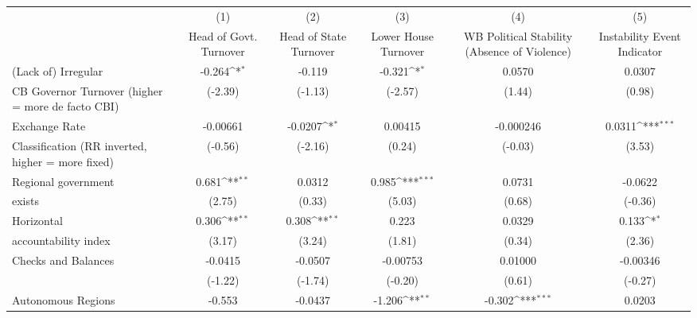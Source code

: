 {
\def\sym#1{\ifmmode^{#1}\else\(^{#1}\)\fi}
\begin{tabular}{l*{5}{c}}
\hline\hline
                    &\multicolumn{1}{c}{(1)}&\multicolumn{1}{c}{(2)}&\multicolumn{1}{c}{(3)}&\multicolumn{1}{c}{(4)}&\multicolumn{1}{c}{(5)}\\
                    &\multicolumn{1}{c}{Head of Govt. Turnover}&\multicolumn{1}{c}{Head of State Turnover}&\multicolumn{1}{c}{Lower House Turnover}&\multicolumn{1}{c}{WB Political Stability (Absence of Violence)}&\multicolumn{1}{c}{Instability Event Indicator}\\
\hline
(Lack of) Irregular &      -0.264\sym{*}  &      -0.119         &      -0.321\sym{*}  &      0.0570         &      0.0307         \\
CB Governor Turnover (higher = more de facto CBI)&     (-2.39)         &     (-1.13)         &     (-2.57)         &      (1.44)         &      (0.98)         \\
[1em]
Exchange Rate       &    -0.00661         &     -0.0207\sym{*}  &     0.00415         &   -0.000246         &      0.0311\sym{***}\\
Classification (RR inverted, higher = more fixed)&     (-0.56)         &     (-2.16)         &      (0.24)         &     (-0.03)         &      (3.53)         \\
[1em]
Regional government &       0.681\sym{**} &      0.0312         &       0.985\sym{***}&      0.0731         &     -0.0622         \\
exists              &      (2.75)         &      (0.33)         &      (5.03)         &      (0.68)         &     (-0.36)         \\
[1em]
Horizontal          &       0.306\sym{**} &       0.308\sym{**} &       0.223         &      0.0329         &       0.133\sym{*}  \\
accountability index&      (3.17)         &      (3.24)         &      (1.81)         &      (0.34)         &      (2.36)         \\
[1em]
Checks and Balances &     -0.0415         &     -0.0507         &    -0.00753         &     0.01000         &    -0.00346         \\
                    &     (-1.22)         &     (-1.74)         &     (-0.20)         &      (0.61)         &     (-0.27)         \\
[1em]
Autonomous Regions  &      -0.553         &     -0.0437         &      -1.206\sym{**} &      -0.302\sym{***}&      0.0203         \\

\end{tabular}}
